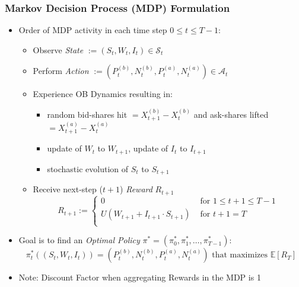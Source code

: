\documentclass[handout]{beamer}
\begin{document}
\begin{frame}
\frametitle{Markov Decision Process (MDP) Formulation}
\pause
\begin{itemize}[<+->]
\item Order of MDP activity in each time step $0 \leq t \leq T-1$:
\begin{itemize}
\item Observe {\em State} $:= (S_t, W_t, I_t) \in \mathcal{S}_t$
\item Perform {\em Action} $:= (P_t^{(b)}, N_t^{(b)}, P_t^{(a)}, N_t^{(a)}) \in \mathcal{A}_t$
\item Experience OB Dynamics resulting in:
\begin{itemize}
\item random bid-shares hit $=X_{t+1}^{(b)} - X_t^{(b)}$ and ask-shares lifted $=X_{t+1}^{(a)} - X_t^{(a)}$
\item update of $W_t$ to $W_{t+1}$, update of $I_t$ to $I_{t+1}$
\item stochastic evolution of $S_t$ to $S_{t+1}$
\end{itemize}
\item Receive next-step ($t+1$) {\em Reward} $R_{t+1}$
$$
R_{t+1} :=
\begin{cases}
0 & \text{ for }1 \leq t+1 \leq T-1 \\
U(W_{t+1} + I_{t+1} \cdot S_{t+1}) & \text{ for } t+1 = T \\
\end{cases}
$$
\end{itemize}
\item Goal is to find an {\em Optimal Policy} $\pi^* = (\pi_0^*, \pi_1^*, \ldots, \pi_{T-1}^*)$:
$$\pi_t^*((S_t, W_t, I_t)) = (P_t^{(b)}, N_t^{(b)}, P_t^{(a)}, N_t^{(a)}) \mbox{ that maximizes } \mathbb{E}[R_T]$$
\item Note: Discount Factor when aggregating Rewards in the MDP is 1
\end{itemize}
\end{frame}
\end{document}

